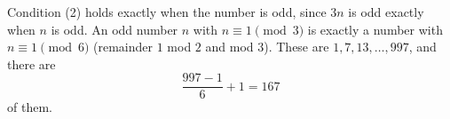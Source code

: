 Condition (2) holds exactly when the number is odd, since $3n$ is odd exactly when $n$ is odd. An odd number $n$ with $n\equiv1\pmod3$ is exactly a number with $n\equiv1\pmod6$ (remainder $1$ mod $2$ and mod $3$). These are $1,7,13,\dots,997$, and there are
\[\dfrac{997-1}{6}+1=\boxed{167}\]
of them.
